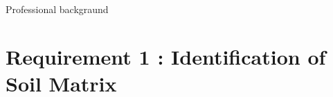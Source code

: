 \documentclass[10pt,xcolor=dvipsnames]{beamer}
\begin{document}
{\begin{frame}{Professional backgraund}
%
%    

\section{Requirement 1 : Identification of Soil Matrix}


\end{frame}}
\end{document}
